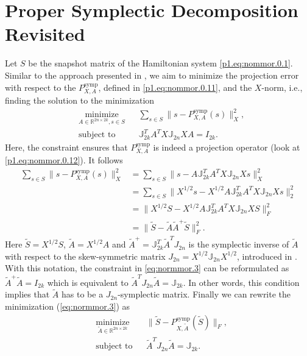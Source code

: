 \section{Proper Symplectic Decomposition Revisited} \label{sec:normmor.1.1}
Let $S$ be the snapshot matrix of the Hamiltonian system \eqref{p1.eq:nommor.0.1}. Similar to the approach presented in , we aim to minimize the projection error with respect to the $P_{X,A}^{\text{symp}}$, defined in \eqref{p1.eq:nommor.0.11}, and the $X$-norm, i.e., finding the solution to the minimization
\begin{equation} \label{eq:normmor.3}
\begin{aligned}
& \underset{A\in \mathbb{R}^{2n\times 2k}, s\in S}{\text{minimize}}
& & \sum_{s\in S} \| s - P_{X,A}^{\text{symp}}(s) \|_X^2, \\
& \text{subject to}
& & \mathbb J_{2k}^T A^T X \mathbb J_{2n} X A = I_{2k}.
\end{aligned}
\end{equation}
Here, the constraint ensures that $P_{X,A}^{\text{symp}}$ is indeed a projection operator (look at \eqref{p1.eq:nommor.0.12}). It follows
\begin{equation} \label{eq:normmor.4}
\begin{aligned}
	\sum_{s\in S} \| s - P_{X,A}^{\text{symp}}(s) \|_X^2 &= \sum_{s\in S} \| s - A \mathbb J_{2k}^T A^T X \mathbb J_{2n} Xs \|_X^2 \\
	&= \sum_{s\in S} \| X^{1/2}s - X^{1/2} A \mathbb J_{2k}^T A^T X \mathbb J_{2n} X s \|_2^2 \\
	&= \| X^{1/2} S - X^{1/2} A \mathbb J_{2k}^T A^T X \mathbb J_{2n} X S \|_F^2 \\
	&= \| \tilde S - \tilde A \tilde A ^+ \tilde S \|_F^2.
\end{aligned}
\end{equation}
Here $\tilde S = X^{1/2} S$, $\tilde A = X^{1/2} A$ and $\tilde A^+ = \mathbb J_{2k}^T \tilde A^T J_{2n}$ is the symplectic inverse of $\tilde A$ with respect to the skew-symmetric matrix $J_{2n} = X^{1/2} \mathbb J_{2n} X^{1/2}$, introduced in . With this notation, the constraint in \eqref{eq:normmor.3} can be reformulated as $\tilde A ^+ \tilde A = I_{2k}$ which is equivalent to $\tilde A ^T J_{2n} \tilde A = \mathbb J_{2k}$. In other words, this condition implies that $\tilde A$ has to be a $J_{2n}$-symplectic matrix. Finally we can rewrite the minimization (\ref{eq:normmor.3}) as
\begin{equation} \label{eq:normmor.5}
\begin{aligned}
& \underset{\tilde A\in \mathbb{R}^{2n\times 2k}}{\text{minimize}}
& & \| \tilde S - P^\text{symp}_{X,\tilde A}(\tilde S) \|_F, \\
& \text{subject to}
& & \tilde A^T J_{2n} \tilde A = \mathbb J_{2k}.
\end{aligned}
\end{equation}
